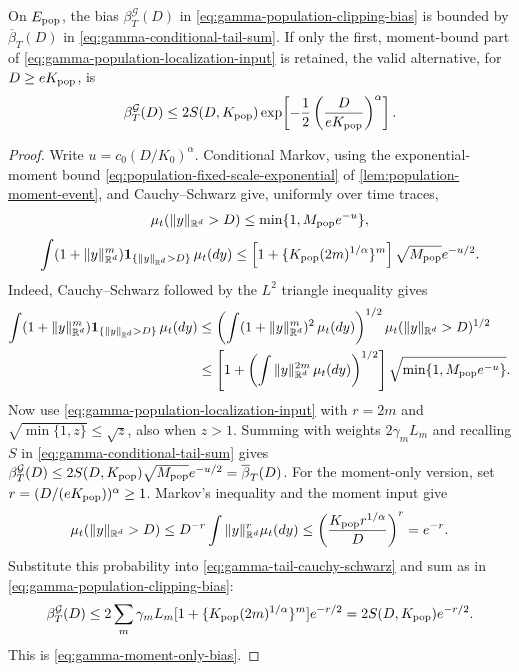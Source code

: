 \begin{lemma}
\label{lemma-beta-tail-bound}
On $E_{\rm pop}$, the bias $\beta_T^{\mathcal G}(D)$ in
\eqref{eq:gamma-population-clipping-bias} is
bounded by $\overline\beta_T(D)$ in
\eqref{eq:gamma-conditional-tail-sum}.
If only the first, moment-bound part of
\eqref{eq:gamma-population-localization-input} is retained, the valid
alternative, for $D\ge eK_{\rm pop}$, is
\begin{equation}
\label{eq:gamma-moment-only-bias}
 \beta_T^{\mathcal G}(D)\le
 2S(D,K_{\rm pop})
 \exp\!\left[-\frac12
               \left(\frac{D}{eK_{\rm pop}}\right)^\alpha\right].
\end{equation}
\end{lemma}
\begin{proof}
Write $u=c_0(D/K_0)^\alpha$. Conditional Markov, using the exponential-moment
bound \eqref{eq:population-fixed-scale-exponential} of
\cref{lem:population-moment-event}, and Cauchy--Schwarz give,
uniformly over time traces,
\[
 \mu_t(\|y\|_{\mathbb R^d}>D)\le\min\{1,M_{\rm pop}e^{-u}\},
\]
\[
\int(1+\|y\|_{\mathbb R^d}^m)\mathbf1_{\{\|y\|_{\mathbb R^d}>D\}}\,\mu_t(dy)
 \le\left[1+\{K_{\rm pop}(2m)^{1/\alpha}\}^{m}\right]
       \sqrt{M_{\rm pop}}e^{-u/2}.
\]
Indeed, Cauchy--Schwarz followed by the $L^2$ triangle inequality gives
\begin{equation}
\label{eq:gamma-tail-cauchy-schwarz}
\begin{aligned}
 \int(1+\|y\|_{\mathbb R^d}^m)\mathbf1_{\{\|y\|_{\mathbb R^d}>D\}}\,\mu_t(dy)
 &\le\left(\int(1+\|y\|_{\mathbb R^d}^m)^2\,\mu_t(dy)\right)^{1/2}
                   \mu_t(\|y\|_{\mathbb R^d}>D)^{1/2}\\
 &\le\left[1+\left(\int\|y\|_{\mathbb R^d}^{2m}\,\mu_t(dy)\right)^{1/2}\right]
                   \sqrt{\min\{1,M_{\rm pop}e^{-u}\}}.
\end{aligned}
\end{equation}
Now use \eqref{eq:gamma-population-localization-input} with $r=2m$
and $\sqrt{\min\{1,z\}}\le\sqrt z$, also when $z>1$.
Summing with weights $2\gamma_mL_m$ and recalling $S$ in
\eqref{eq:gamma-conditional-tail-sum} gives
$\beta_T^{\mathcal G}(D)\le2S(D,K_{\rm pop})\sqrt{M_{\rm pop}}e^{-u/2}
=\overline\beta_T(D)$.
For the moment-only version, set $r=(D/(eK_{\rm pop}))^\alpha\ge1$.
Markov's inequality and the moment input give
\begin{equation}
\label{eq:moment-tail-markov-substitution}
 \mu_t(\|y\|_{\mathbb R^d}>D)\le D^{-r}\int\|y\|_{\mathbb R^d}^r\mu_t(dy)
 \le\left(\frac{K_{\rm pop}r^{1/\alpha}}D\right)^r=e^{-r}.
\end{equation}
Substitute this probability into \eqref{eq:gamma-tail-cauchy-schwarz}
and sum as in \eqref{eq:gamma-population-clipping-bias}:
\[
 \beta_T^{\mathcal G}(D)
 \le2\sum_m\gamma_mL_m[1+\{K_{\rm pop}(2m)^{1/\alpha}\}^m]e^{-r/2}
 =2S(D,K_{\rm pop})e^{-r/2}.
\]
This is \eqref{eq:gamma-moment-only-bias}.
\end{proof}

